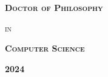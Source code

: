 \documentclass[
11pt, %
oneside, %
english, %
singlespacing, %
liststotoc, %
headsepline, %
]{MastersDoctoralThesis} %
\begin{document}
\begin{titlepage}
\begin{center}
    \vspace{0.25cm}
    
    \noindent \textsc{\textbf{Doctor of Philosophy}}
    
    \vspace{0.25cm}
    
    \noindent \textsc{in}
    
    \vspace{0.25cm}
    
    \noindent \textsc{\textbf{Computer Science}}
    
    \vspace{0.25cm}
    
    \noindent \textsc{\textbf{2024}}
    
  \end{center}

\end{titlepage}





 
\end{document}
